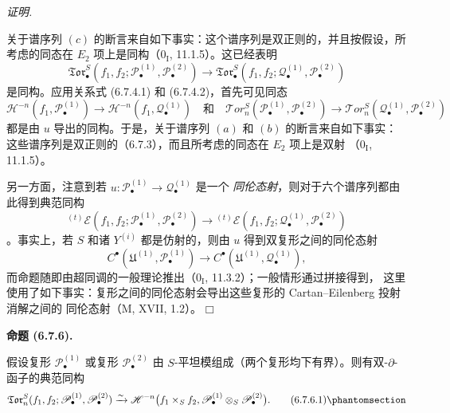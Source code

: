 \documentclass[UTF8,fontset=none,11pt,oneside,openany]{ctexbook}
\providecommand{\square}{\mdlgwhtsquare}
\newenvironment{proposition}[1][]{%
  \par\medskip\noindent\textbf{命题 (#1).}\ %
}{\par}
\newenvironment{proof}{%
  \par\smallskip\noindent\textit{证明.}\ %
}{\hfill$\square$\par}
\let\EGAOriginalLabel\label
\renewcommand{\label}[1]{\phantomsection\EGAOriginalLabel{#1}}
\begin{document}
\begin{proof}
关于谱序列 $(c)$ 的断言来自如下事实：这个谱序列是双正则的，并且按假设，所考虑的同态在
$E_2$ 项上是同构（$0_{\mathrm I}$, 11.1.5）。这已经表明
\[
  \mathfrak{Tor}_\bullet^S
  (f_1,f_2;\mathscr P_\bullet^{(1)},\mathscr P_\bullet^{(2)})
  \longrightarrow
  \mathfrak{Tor}_\bullet^S
  (f_1,f_2;\mathscr Q_\bullet^{(1)},\mathscr P_\bullet^{(2)})
\]
是同构。应用关系式 (6.7.4.1) 和 (6.7.4.2)，首先可见同态
\[
  \mathscr H^{-n}(f_1,\mathscr P_\bullet^{(1)})
  \longrightarrow
  \mathscr H^{-n}(f_1,\mathscr Q_\bullet^{(1)})
  \quad\text{和}\quad
  \mathscr{T}\!or_n^S
  (\mathscr P_\bullet^{(1)},\mathscr P_\bullet^{(2)})
  \longrightarrow
  \mathscr{T}\!or_n^S
  (\mathscr Q_\bullet^{(1)},\mathscr P_\bullet^{(2)})
\]
都是由 $u$ 导出的同构。于是，关于谱序列 $(a)$ 和 $(b)$ 的断言来自如下事实：
这些谱序列是双正则的（6.7.3），而且所考虑的同态在 $E_2$ 项上是双射
（$0_{\mathrm I}$, 11.1.5）。

另一方面，注意到若 $u:\mathscr P_\bullet^{(1)}\to\mathscr Q_\bullet^{(1)}$ 是一个
\emph{同伦态射}，则对于六个谱序列都由此得到典范同构
\[
  {}^{(t)}\mathscr E
  (f_1,f_2;\mathscr P_\bullet^{(1)},\mathscr P_\bullet^{(2)})
  \longrightarrow
  {}^{(t)}\mathscr E
  (f_1,f_2;\mathscr Q_\bullet^{(1)},\mathscr P_\bullet^{(2)})
\]
。事实上，若 $S$ 和诸 $Y^{(i)}$ 都是仿射的，则由 $u$ 得到双复形之间的同伦态射
\[
  C^\bullet(\mathfrak U^{(1)},\mathscr P_\bullet^{(1)})
  \longrightarrow
  C^\bullet(\mathfrak U^{(1)},\mathscr Q_\bullet^{(1)}),
\]
而命题随即由超同调的一般理论推出（$0_{\mathrm I}$, 11.3.2）；一般情形通过拼接得到，
这里使用了如下事实：复形之间的同伦态射会导出这些复形的 Cartan--Eilenberg 投射消解之间的
同伦态射（M, XVII, 1.2）。
\end{proof}

\begin{proposition}[6.7.6]
假设复形 $\mathscr P_\bullet^{(1)}$ 或复形 $\mathscr P_\bullet^{(2)}$
由 $S$-平坦模组成（两个复形均下有界）。则有双-$\partial$-函子的典范同构
\[
  \mathfrak{Tor}_n^S
  (f_1,f_2;\mathscr P_\bullet^{(1)},\mathscr P_\bullet^{(2)})
  \xrightarrow{\sim}
  \mathscr H^{-n}\bigl(f_1\times_S f_2,
    \mathscr P_\bullet^{(1)}\otimes_S\mathscr P_\bullet^{(2)}\bigr).
  \tag{6.7.6.1}\label{III.6.7.6.1.fr}
\]
\end{proposition}
\end{document}
